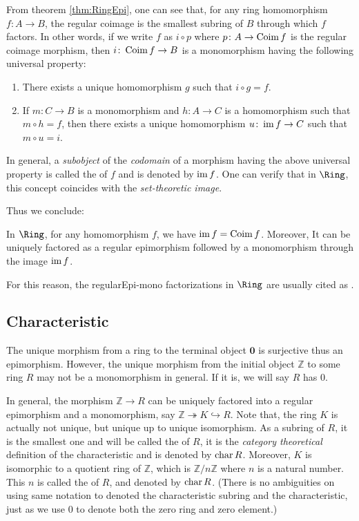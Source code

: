   From theorem \ref{thm:RingEpi}, one can see that, for any ring homomorphism $f\colon A\to B$, the regular coimage is the smallest subring of $B$ through which $f$ factors. In other words, if we write $f$ as $i\circ p$ where $p\colon A\to\operatorname{Coim}{f}$ is the regular coimage morphism, then $i\colon\operatorname{Coim}{f}\to B$ is a monomorphism having the following universal property:
  \begin{enumerate}
    \item There exists a unique homomorphism $g$ such that $i\circ g = f$.
    \item If $m\colon C\to B$ is a monomorphism and $h\colon A\to C$ is a homomorphism such that $m\circ h = f$, then there exists a unique homomorphism $u\colon \operatorname{im}{f}\to C$ such that $m\circ u = i$.
  \end{enumerate}
  In general, a \emph{subobject} of the \emph{codomain} of a morphism having the above universal property is called the  of $f$ and is denoted by $\operatorname{im}{f}$.
  One can verify that in $\Ring$, this concept coincides with the \emph{set-theoretic image}.

  Thus we conclude:
  \begin{cor}
    In $\Ring$, for any homomorphism $f$, we have $\operatorname{im}{f}=\operatorname{Coim}{f}$. Moreover, It can be uniquely factored as a regular epimorphism followed by a monomorphism through the image $\operatorname{im}{f}$.
  \end{cor}
  For this reason, the regularEpi-mono factorizations in $\Ring$ are usually cited as .

\subsection{Characteristic}
  The unique morphism from a ring to the terminal object $\mathbf{0}$ is surjective thus an epimorphism. However, the unique morphism from the initial object $\mathbb{Z}$ to some ring $R$ may not be a monomorphism in general. If it is, we will say $R$ has  $0$.

  In general, the morphism $\mathbb{Z}\to R$ can be uniquely factored into a regular epimorphism and a monomorphism, say $\mathbb{Z}\twoheadrightarrow K\hookrightarrow R$.  Note that, the ring $K$ is actually not unique, but unique up to unique isomorphism. As a subring of $R$, it is the smallest one and will be called the  of $R$, it is the \emph{category theoretical} definition of the characteristic and is denoted by $\operatorname{char}{R}$.  Moreover, $K$ is isomorphic to a quotient ring of $\mathbb{Z}$, which is $\mathbb{Z}/n\mathbb{Z}$ where $n$ is a natural number. This $n$ is called the  of $R$, and denoted by $\operatorname{char}{R}$. (There is no ambiguities on using same notation to denoted the characteristic subring and the characteristic, just as we use $0$ to denote both the zero ring and zero element.)

